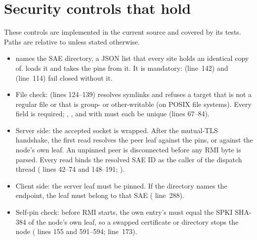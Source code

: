 \documentclass[11pt,a4paper]{article}
\begin{document}
\section{Security controls that hold}\label{sec:controls}
These controls are implemented in the current source and covered by its tests. Paths are relative to  unless stated otherwise.
\begin{description}[style=nextline,leftmargin=1.2em]
\item[C-1 RMI peer authentication by SPKI pin]\label{c:C-1}
\begin{itemize}
\item {} names the SAE directory, a JSON list  that every site holds an identical copy of.  loads it and  takes the pins from it. It is mandatory:  (line~142) and  (line~114) fail closed without it.
\item File check:  (lines 124--139) resolves symlinks and refuses a target that is not a regular file or that is group- or other-writable (on POSIX file systems). Every field is required; , ,  and  with  must each be unique (lines 67--84).
\item Server side: the accepted socket is wrapped. After the  mutual-TLS handshake, the first read resolves the peer leaf against the pins, or against the node's own leaf. An unpinned peer is disconnected before any RMI byte is parsed. Every read binds the resolved SAE ID as the caller of the dispatch thread ( lines 42--74 and 148--191; ).
\item Client side: the server leaf must be pinned. If the directory names the endpoint, the leaf must belong to that SAE ( line~288).
\item Self-pin check: before RMI starts, the own entry's  must equal the SPKI SHA-384 of the node's own leaf, so a swapped certificate or directory stops the node ( lines 155 and 591--594;  line~173).
\end{itemize}
\item[C-2 Caller-based authorization in \code{NodeCommandsService}]\label{c:C-2}
\begin{itemize}

\end{itemize}
\end{description}
\end{document}
